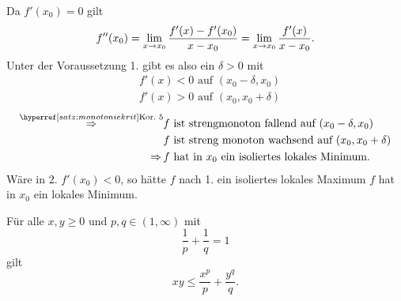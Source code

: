 \documentclass[../ana1.tex]{subfiles}
\begin{document}
\begin{bew}
    Da \( f'(x_0) = 0 \) gilt 
    \[ f''(x_0) = \lim\limits_{x\rightarrow x_0} 
    \frac{f'(x) - f'(x_0)}{x - x_0} 
    = \lim\limits_{x\rightarrow x_0} \frac{f'(x)}{x - x_0}. \]
    Unter der Voraussetzung 1. gibt es also ein 
    \( \delta > 0 \) mit 
    \begin{align*}
        &f'(x) < 0 \text{ auf } (x_0 - \delta, x_0) \\
        &f'(x) > 0 \text{ auf } (x_0, x_0 + \delta)        
    \end{align*}
    \begin{align*}
        \overref{satz:monotoniekrit}{Kor.\ 5}{\Rightarrow} 
        &f \text{ ist streng}
        \text{monoton fallend auf } (x_0 - \delta, x_0) \\
        &f \text{ ist streng monoton wachsend auf }
        (x_0, x_0 + \delta) \\
        \Rightarrow \, &f \text{ hat in } x_0
        \text{ ein isoliertes lokales Minimum.}                                        
    \end{align*}
    Wäre in 2. \( f'(x_0) < 0 \), so hätte \( f \) nach 1. 
    ein isoliertes lokales Maximum \Lightning{} \( f \) hat 
    in \(x_0\) ein lokales Minimum.
\end{bew}
\begin{bsp}
    Für alle \( x,y \geq 0 \) und \( p,q \in (1,\infty) \) 
    mit 
    \[ \frac{1}{p} + \frac{1}{q} = 1 \]
    gilt
    \[ xy \leq \frac{x^p}{p} + \frac{y^q}{q}. \]
\end{bsp}
\end{document}
